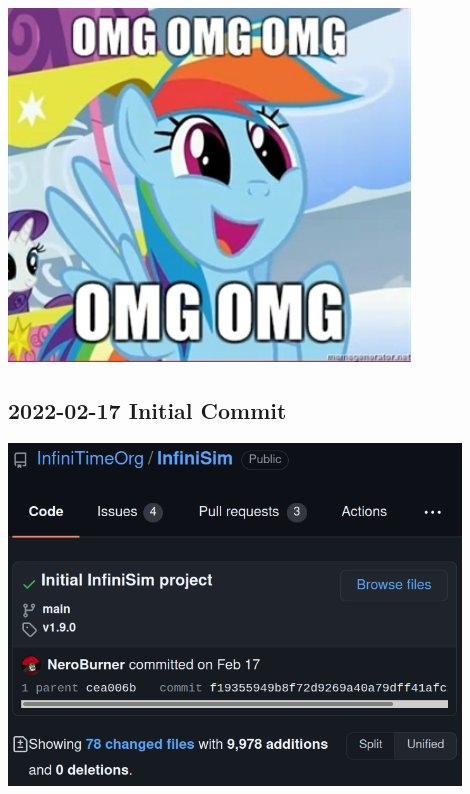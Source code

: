 \documentclass{beamer}
\begin{document}
\begin{frame}{}

  \centering\includegraphics[width=0.8\textwidth]{../pony_rainbow_omg_omg}

\end{frame}

\subsection{2022-02-17 Initial Commit}
\begin{frame}{}
  \centering\includegraphics[width=0.9\textwidth]{../2022-02-17_InfiniSim_initial_commit}
\end{frame}
\end{document}
